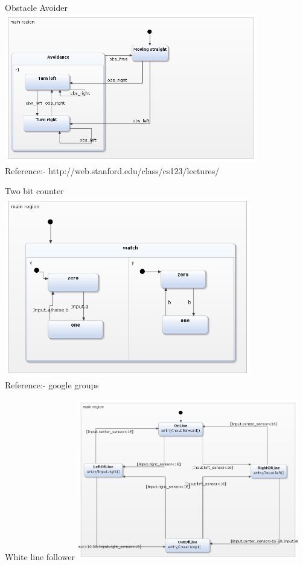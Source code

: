 \documentclass[10pt, a4paper]{beamer}
\begin{document}
\begin{frame}{Obstacle Avoider}
\includegraphics[width=11.04cm, height=6.5cm]{obstacle_avoider.png}
\\
Reference:- http://web.stanford.edu/class/cs123/lectures/
\end{frame}

\begin{frame}{Two bit counter}
\includegraphics[width=10.76cm, height=7.85cm]{TwoBitCounter.png}
\\
Reference:- google groups
\end{frame}
\begin{frame}{White line follower}
\includegraphics[width=9.66cm, height=7cm]{WhiteLineFollower.png}
\end{frame}
\end{document}
